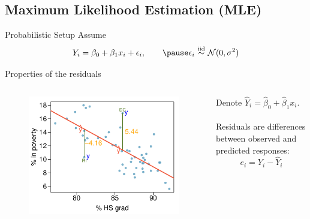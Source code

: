 \documentclass{beamer}
\begin{document}
\subsection{Maximum Likelihood Estimation (MLE)}
\begin{frame}{Probabilistic Setup}
    Assume
    $$
    Y_i=\beta_0+\beta_1 x_i+\epsilon_i,\qquad\pause\epsilon_i\,\,{\stackrel{\text{iid}}{\sim}}\,\,\mathcal{N}(0,\sigma^2)
    $$%
\end{frame}

\begin{frame}{Properties of the residuals}
\begin{columns}
\begin{column}{.5\textwidth}
\begin{figure}
    \centering
    \includegraphics[width=\textwidth]{plots/poverty_hsgrad_res_text.pdf}
\end{figure}
\end{column}
\begin{column}{.5\textwidth}
Denote $\hat{Y}_i=\hat{\beta}_0+\hat{\beta}_1 x_i$.\\~\\
\pause Residuals are differences between observed and predicted responses:
$$
e_i=Y_i-\hat{Y}_i
$$
\end{column}
\end{columns}
\vfill


\end{frame}
\end{document}
